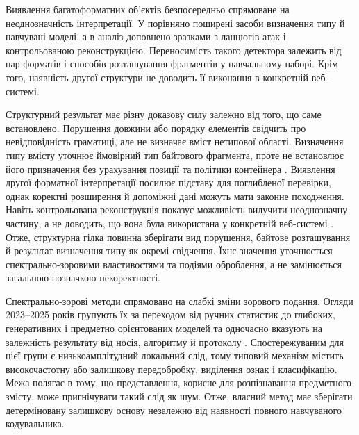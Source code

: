 Виявлення багатоформатних об’єктів безпосередньо спрямоване на неоднозначність інтерпретації. У \cite{koch2022polyglot} порівняно поширені засоби визначення типу й навчувані моделі, а в \cite{koch2025polyglot} аналіз доповнено зразками з ланцюгів атак і контрольованою реконструкцією. Переносимість такого детектора залежить від пар форматів і способів розташування фрагментів у навчальному наборі. Крім того, наявність другої структури не доводить її виконання в конкретній веб-системі.

Структурний результат має різну доказову силу залежно від того, що саме встановлено. Порушення довжини або порядку елементів свідчить про невідповідність граматиці, але не визначає вміст нетипової області. Визначення типу вмісту уточнює ймовірний тип байтового фрагмента, проте не встановлює його призначення без урахування позиції та політики контейнера \cite{mittal2021fifty,haque2022byteembeddings,skracic2023bytercnn}. Виявлення другої форматної інтерпретації посилює підставу для поглибленої перевірки, однак коректні розширення й допоміжні дані можуть мати законне походження. Навіть контрольована реконструкція показує можливість вилучити неоднозначну частину, а не доводить, що вона була використана у конкретній веб-системі \cite{koch2022polyglot,koch2025polyglot}. Отже, структурна гілка повинна зберігати вид порушення, байтове розташування й результат визначення типу як окремі свідчення. Їхнє значення уточнюється спектрально-зоровими властивостями та подіями оброблення, а не замінюється загальною позначкою некоректності.

Спектрально-зорові методи спрямовано на слабкі зміни зорового подання. Огляди 2023--2025 років групують їх за переходом від ручних статистик до глибоких, генеративних і предметно орієнтованих моделей та одночасно вказують на залежність результату від носія, алгоритму й протоколу \cite{rustad2023survey,wani2023review,luo2024survey,michaylov2025forensic}. Спостережуваним для цієї групи є низькоамплітудний локальний слід, тому типовий механізм містить високочастотну або залишкову передобробку, виділення ознак і класифікацію. Межа полягає в тому, що представлення, корисне для розпізнавання предметного змісту, може пригнічувати такий слід як шум. Отже, власний метод має зберігати детерміновану залишкову основу незалежно від наявності повного навчуваного кодувальника.

